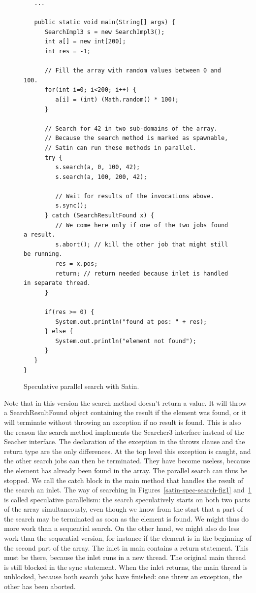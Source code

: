 \documentclass[10pt]{article}
\begin{document}
\begin{figure}[t!]
{\small
\begin{verbatim}
   ...

   public static void main(String[] args) {
      SearchImpl3 s = new SearchImpl3();
      int a[] = new int[200];
      int res = -1;

      // Fill the array with random values between 0 and 100.
      for(int i=0; i<200; i++) {
         a[i] = (int) (Math.random() * 100);
      }

      // Search for 42 in two sub-domains of the array.
      // Because the search method is marked as spawnable,
      // Satin can run these methods in parallel.
      try {
         s.search(a, 0, 100, 42);
         s.search(a, 100, 200, 42);

         // Wait for results of the invocations above.
         s.sync();
      } catch (SearchResultFound x) {
         // We come here only if one of the two jobs found a result.
         s.abort(); // kill the other job that might still be running.
         res = x.pos;
         return; // return needed because inlet is handled in separate thread.
      }

      if(res >= 0) {
         System.out.println("found at pos: " + res);
      } else {
         System.out.println("element not found");
      }
   }
}
\end{verbatim}
}
\caption{Speculative parallel search with Satin.}
\label{satin-spec-search-fig2}
\end{figure}

Note that in this version the search method doesn't return a value. It
will throw a SearchResultFound object containing the result if the
element was found, or it will terminate without throwing an exception
if no result is found. This is also the reason the search method
implements the Searcher3 interface instead of the Seacher
interface. The declaration of the exception in the throws clause and
the return type are the only differences.  At the top level this
exception is caught, and the other search jobs can then be
terminated. They have become useless, because the element has already
been found in the array. The parallel search can thus be stopped. We
call the catch block in the main method that handles the result of the
search an inlet.  The way of searching in Figures~\ref{satin-spec-search-fig1} and~\ref{satin-spec-search-fig2} is called
speculative parallelism: the search speculatively starts on both two
parts of the array simultaneously, even though we know from the start
that a part of the search may be terminated as soon as the element is
found. We might thus do more work than a sequential search. On the
other hand, we might also do less work than the sequential version,
for instance if the element is in the beginning of the second part of
the array.  The inlet in main contains a return statement. This must
be there, because the inlet runs in a new thread. The original main
thread is still blocked in the sync statement. When the inlet returns,
the main thread is unblocked, because both search jobs have finished:
one threw an exception, the other has been aborted.  
\end{document}
